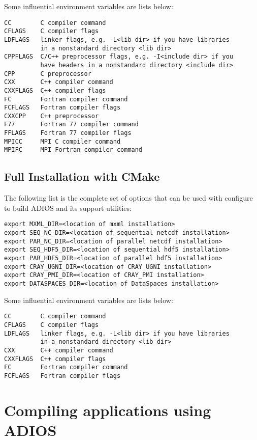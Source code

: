 Some influential environment variables are lists below:

\begin{lstlisting}
CC        C compiler command
CFLAGS    C compiler flags
LDFLAGS   linker flags, e.g. -L<lib dir> if you have libraries 
          in a nonstandard directory <lib dir>
CPPFLAGS  C/C++ preprocessor flags, e.g. -I<include dir> if you
          have headers in a nonstandard directory <include dir>
CPP       C preprocessor
CXX       C++ compiler command
CXXFLAGS  C++ compiler flags
FC        Fortran compiler command
FCFLAGS   Fortran compiler flags
CXXCPP    C++ preprocessor
F77       Fortran 77 compiler command
FFLAGS    Fortran 77 compiler flags
MPICC     MPI C compiler command
MPIFC     MPI Fortran compiler command
\end{lstlisting}

\subsection{Full Installation with CMake}

The following list is the complete set of options that can be used with configure to build ADIOS and its support utilities:

\begin{lstlisting}
export MXML_DIR=<location of mxml installation>
export SEQ_NC_DIR=<location of sequential netcdf installation>
export PAR_NC_DIR=<location of parallel netcdf installation>
export SEQ_HDF5_DIR=<location of sequential hdf5 installation>
export PAR_HDF5_DIR=<location of parallel hdf5 installation>
export CRAY_UGNI_DIR=<location of CRAY UGNI installation>
export CRAY_PMI_DIR=<location of CRAY_PMI installation>
export DATASPACES_DIR=<location of DataSpaces installation>
\end{lstlisting}

Some influential environment variables are lists below:
\begin{lstlisting}
CC        C compiler command
CFLAGS    C compiler flags
LDFLAGS   linker flags, e.g. -L<lib dir> if you have libraries 
          in a nonstandard directory <lib dir>
CXX       C++ compiler command
CXXFLAGS  C++ compiler flags
FC        Fortran compiler command
FCFLAGS   Fortran compiler flags
\end{lstlisting}

\section{Compiling applications using ADIOS}
\label{section:installation_compiling_apps}

